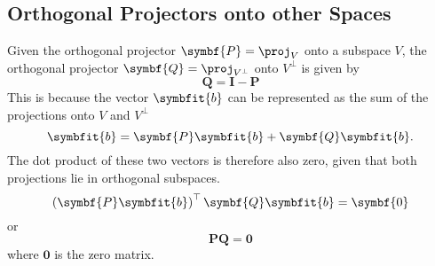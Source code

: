 \documentclass{article}
\begin{document}
\subsection{Orthogonal Projectors onto other Spaces}
Given the orthogonal projector \(\symbf{P} = \proj_V\) onto a subspace \(V\), the 
orthogonal projector \(\symbf{Q} = \proj_{V^\perp}\) onto \(V^\perp\) is given by 
\begin{equation*}
    \symbf{Q} = \symbf{I} - \symbf{P}
\end{equation*}
This is because the vector \(\symbfit{b}\) can be represented as the 
sum of the projections onto \(V\) and \(V^\perp\)
\begin{equation*}
    \symbfit{b} = \symbf{P}\symbfit{b} + \symbf{Q}\symbfit{b}.
\end{equation*}
The dot product of these two vectors is therefore also zero, given that 
both projections lie in orthogonal subspaces.
\begin{equation*}
    \left( \symbf{P}\symbfit{b} \right)^\top \symbf{Q}\symbfit{b} = \symbf{0}
\end{equation*}
or 
\begin{equation*}
    \symbf{P} \symbf{Q} = \symbf{0}
\end{equation*}
where \(\symbf{0}\) is the zero matrix.
\end{document}
